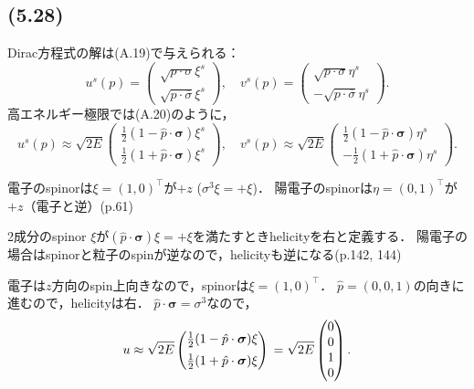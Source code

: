 \subsection{(5.28)}
Dirac方程式の解は(A.19)で与えられる：
\[
u^s(p) =
\begin{pmatrix}
  \sqrt{p \cdot \sigma} \xi^s \\[5pt]
  \sqrt{p \cdot \overline\sigma} \xi^s
\end{pmatrix}
, \quad
v^s(p) =
\begin{pmatrix}
  \sqrt{p \cdot \sigma} \eta^s \\[5pt]
  - \sqrt{p \cdot \overline\sigma} \eta^s
\end{pmatrix}
.
\]
高エネルギー極限では(A.20)のように，
\[
u^s(p) \approx \sqrt{2E}
\begin{pmatrix}
  \frac{1}{2} (1 - \hat{p} \cdot \boldsymbol\sigma) \xi^s \\[5pt]
  \frac{1}{2} (1 + \hat{p} \cdot \boldsymbol\sigma) \xi^s
\end{pmatrix}
, \quad
v^s(p) \approx \sqrt{2E}
\begin{pmatrix}
  \frac{1}{2} (1 - \hat{p} \cdot \boldsymbol\sigma) \eta^s \\[5pt]
  - \frac{1}{2} (1 + \hat{p} \cdot \boldsymbol\sigma) \eta^s
\end{pmatrix}
.
\]

\begin{screen}
  電子のspinorは\(\xi=(1, 0)^\top\)が\(+z\) (\(\sigma^3\xi=+\xi\))．
  陽電子のspinorは\(\eta=(0, 1)^\top\)が\(+z\)（電子と逆）(p.\@ 61)
\end{screen}
\begin{screen}
  2成分のspinor $\xi$が$(\hat{p} \cdot \boldsymbol\sigma) \xi = + \xi$を満たすときhelicityを右と定義する．
  陽電子の場合はspinorと粒子のspinが逆なので，helicityも逆になる(p.\@ 142, 144)
\end{screen}

電子は$z$方向のspin上向きなので，spinorは$\xi = (1, 0)^\top$．
$\hat{p} = (0, 0, 1)$の向きに進むので，helicityは右．
$\hat{p}\cdot\boldsymbol\sigma = \sigma^3$なので，
\[
u \approx \sqrt{2E}
\begin{pmatrix}
  \frac{1}{2} (1 - \hat{p} \cdot \boldsymbol\sigma) \xi \\[5pt]
  \frac{1}{2} (1 + \hat{p} \cdot \boldsymbol\sigma) \xi
\end{pmatrix}
\\
= \sqrt{2E}
\begin{pmatrix}
  0 \\
  0 \\
  1 \\
  0
\end{pmatrix}
.
\]

